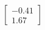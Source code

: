 \documentclass[preview]{standalone}
\begin{document}
\begin{align*}
\begin{bmatrix} -0.41 \\ 1.67 \end{bmatrix}
\end{align*}
\end{document}
